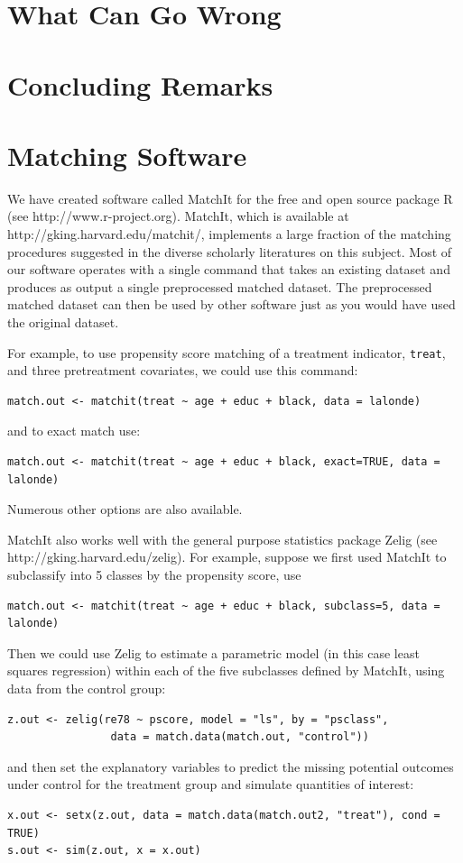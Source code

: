 \documentclass[11pt,titlepage]{article}
\begin{document}
\section{What Can Go Wrong}

\section{Concluding Remarks}

\appendix
\section{Matching Software}\label{s:matchit}

We have created software called MatchIt for the free and open source
package R (see http://www.r-project.org).  MatchIt, which is available
at http://gking.harvard.edu/matchit/, implements a large fraction of
the matching procedures suggested in the diverse scholarly literatures
on this subject.  Most of our software operates with a single command
that takes an existing dataset and produces as output a single
preprocessed matched dataset.  The preprocessed matched dataset can
then be used by other software just as you would have used the
original dataset.

For example, to use propensity score matching of a treatment
indicator, \texttt{treat}, and three pretreatment covariates, we could
use this command:
\begin{verbatim}
match.out <- matchit(treat ~ age + educ + black, data = lalonde)
\end{verbatim}
and to exact match use:
\begin{verbatim}
match.out <- matchit(treat ~ age + educ + black, exact=TRUE, data = lalonde)
\end{verbatim}
Numerous other options are also available.

MatchIt also works well with the general purpose statistics package
Zelig (see \\ http://gking.harvard.edu/zelig).  For example, suppose we
first used MatchIt to subclassify into 5 classes by the propensity
score, use
\begin{verbatim}
match.out <- matchit(treat ~ age + educ + black, subclass=5, data = lalonde)
\end{verbatim}
Then we could use Zelig to estimate a parametric model (in this case
least squares regression) within each of the five subclasses defined
by MatchIt, using data from the control group:
\begin{verbatim}
z.out <- zelig(re78 ~ pscore, model = "ls", by = "psclass", 
                data = match.data(match.out, "control"))
\end{verbatim}
and then set the explanatory variables to predict the missing potential
outcomes under control for the treatment group and simulate quantities of interest:
\begin{verbatim}
x.out <- setx(z.out, data = match.data(match.out2, "treat"), cond = TRUE)
s.out <- sim(z.out, x = x.out)
\end{verbatim}


\baselineskip 

\end{document}

